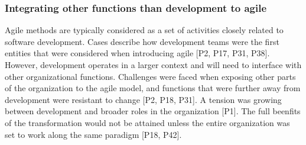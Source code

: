 \documentclass[preprint,authoryear,12pt]{elsarticle}
\begin{document}

%






\subsubsection{Integrating other functions than development to agile}

Agile methods are typically considered as a set of activities closely related to
software development. Cases describe how development teams were the first
entities that were considered when introducing agile [P2, P17, P31, P38].
However, development operates in a larger context and will need to interface
with other organizational functions.
Challenges were faced when exposing other parts of the organization to the agile
model, and functions that were further away from development were resistant to
change [P2, P18, P31]. A tension was growing between development and broader
roles in the organization [P1]. The full beenfits of the transformation would
not be attained unless the entire organization was set to work along the same
paradigm [P18, P42].
\end{document}
